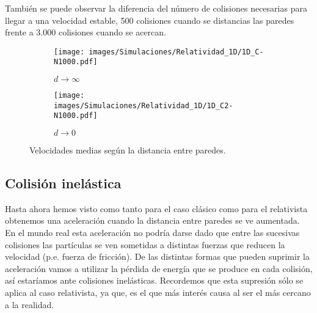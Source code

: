 \vspace{3mm}

 También se puede observar la diferencia del número de colisiones necesarias para llegar a una velocidad estable, 500 colisiones cuando se distancias las paredes frente a 3.000 colisiones cuando se acercan.

\begin{figure}[!h]
    \begin{subfigure}[b]{0.5\textwidth}
        \centering
        \texttt{[image: images/Simulaciones/Relatividad\_1D/1D\_C-N1000.pdf]}
        \caption{$d \rightarrow \infty$}
        \label{fig:relatividad_1D_C}
    \end{subfigure}
    \hfill
    \begin{subfigure}[b]{0.5\textwidth}
        \centering
        \texttt{[image: images/Simulaciones/Relatividad\_1D/1D\_C2-N1000.pdf]}
        \caption{$d \rightarrow 0$}
        \label{fig:relatividad_1D_C2}
    \end{subfigure}
    \caption{Velocidades medias según la distancia entre paredes.}
\end{figure}

\subsection{Colisión inelástica}

Hasta ahora hemos visto como tanto para el caso clásico como para el relativista obtenemos una aceleración cuando la distancia entre paredes se ve aumentada. En el mundo real esta aceleración no podría darse dado que entre las sucesivas colisiones las partículas se ven sometidas a distintas fuerzas que reducen la velocidad (p.e. fuerza de fricción). De las distintas formas que pueden suprimir la aceleración vamos a utilizar la pérdida de energía que se produce en cada colisión, así estaríamos ante colisiones inelásticas. Recordemos que esta supresión sólo se aplica al caso relativista, ya que, es el que más interés causa al ser el más cercano a la realidad.





